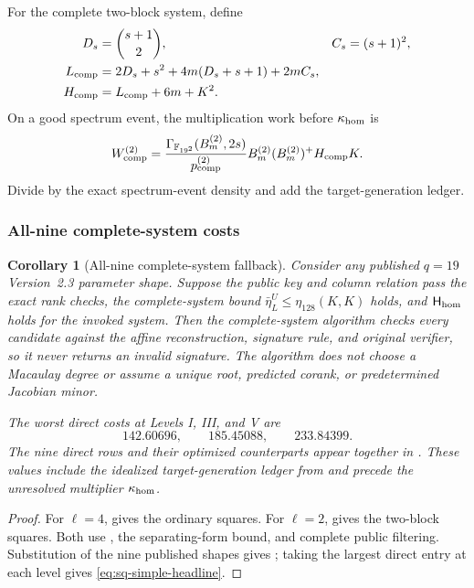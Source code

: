 \documentclass[11pt]{article}
\newtheorem{corollary}[theorem]{Corollary}
\newcommand{\F}{\mathbb F}
\begin{document}
For the complete two-block system, define
\begin{align}
 D_s&=\binom{s+1}{2},& C_s&=(s+1)^2,\notag\\
 L_{\rm comp}&=2D_s+s^2+4m(D_s+s+1)+2mC_s,\notag\\
 H_{\rm comp}&=L_{\rm comp}+6m+K^2.
\end{align}
On a good spectrum event, the multiplication work before
$\kappa_{\rm hom}$ is
\begin{equation}
 W_{\rm comp}^{(2)}
 =\frac{\Gamma_{\F_{19^2}}(B_m^{(2)},2s)}
        {p_{\rm comp}^{(2)}}
   B_m^{(2)}(B_m^{(2)})^+H_{\rm comp}K.              \label{eq:sq-l2-work}
\end{equation}
Divide by the exact spectrum-event density and add the target-generation
ledger.

\subsubsection{All-nine complete-system costs}

\begin{corollary}[All-nine complete-system fallback]
\label{thm:sq-all-nine-simple}
Consider any published $q=19$ Version~2.3 parameter shape.  Suppose the public
key and column relation pass the exact rank checks, the complete-system bound
$\bar\eta_L^U\le\eta_{128}(K,K)$ holds, and $\mathsf H_{\rm hom}$ holds for
the invoked system.  Then the complete-system algorithm checks every candidate
against the affine reconstruction, signature rule, and original verifier, so
it never returns an invalid signature.  The algorithm does not choose a
Macaulay degree or assume a unique root, predicted corank, or predetermined
Jacobian minor.

The worst direct costs at Levels I, III, and V are
\begin{equation}
 \boxed{142.60696,\qquad185.45088,\qquad233.84399}.   \label{eq:sq-simple-headline}
\end{equation}
The nine direct rows and their optimized counterparts appear together in
.  These values include the idealized target-generation
ledger from  and precede the unresolved multiplier
$\kappa_{\rm hom}$.
\end{corollary}

\begin{proof}
For $\ell=4$,  gives the ordinary squares.  For
$\ell=2$,  gives the two-block squares.  Both use
, the separating-form bound, and complete public
filtering.  Substitution of the nine published shapes gives
; taking the largest direct entry at each level gives
\eqref{eq:sq-simple-headline}.
\end{proof}
\end{document}
